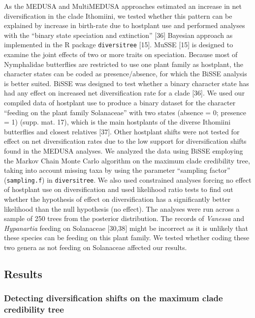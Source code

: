 \documentclass[]{article}
\begin{document}
As the MEDUSA and MultiMEDUSA approaches estimated an increase in net
diversification in the clade Ithomiini, we tested whether this pattern
can be explained by increase in birth-rate due to hostplant use and
performed analyses with the ``binary state speciation and extinction''
{[}36{]} Bayesian approach as implemented in the R package
\texttt{diversitree} {[}15{]}. MuSSE {[}15{]} is designed to examine the
joint effects of two or more traits on speciation. Because most of
Nymphalidae butterflies are restricted to use one plant family as
hostplant, the character states can be coded as presence/absence, for
which the BiSSE analysis is better suited. BiSSE was designed to test
whether a binary character state has had any effect on increased net
diversification rate for a clade {[}36{]}. We used our compiled data of
hostplant use to produce a binary dataset for the character ``feeding on
the plant family Solanaceae'' with two states (absence = 0; presence =
1) (supp. mat. 17), which is the main hostplants of the diverse
Ithomiini butterflies and closest relatives {[}37{]}. Other hostplant
shifts were not tested for effect on net diversification rates due to
the low support for diversification shifts found in the MEDUSA analyses.
We analyzed the data using BiSSE employing the Markov Chain Monte Carlo
algorithm on the maximum clade credibility tree, taking into account
missing taxa by using the parameter ``sampling factor''
(\texttt{sampling.f}) in \texttt{diversitree}. We also used constrained
analyses forcing no effect of hostplant use on diversification and used
likelihood ratio tests to find out whether the hypothesis of effect on
diversification has a significantly better likelihood than the null
hypothesis (no effect). The analyses were run across a sample of 250
trees from the posterior distribution. The records of \emph{Vanessa} and
\emph{Hypanartia} feeding on Solanaceae {[}30,38{]} might be incorrect
as it is unlikely that these species can be feeding on this plant
family. We tested whether coding these two genera as not feeding on
Solanaceae affected our results.

\subsection{Results}\label{results}

\subsubsection{Detecting diversification shifts on the maximum clade
credibility
tree}\label{detecting-diversification-shifts-on-the-maximum-clade-credibility-tree}
\end{document}
